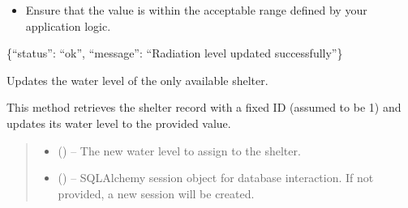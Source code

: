 \documentclass[letterpaper,10pt,english]{sphinxmanual}
\begin{document}
\begin{fulllineitems}
\begin{fulllineitems}
\begin{itemize}
\item {} 
\sphinxAtStartPar
Ensure that the  value is within the acceptable range defined by your application logic.

\end{itemize}
\begin{description}
\sphinxAtStartPar
\{“status”: “ok”, “message”: “Radiation level updated successfully”\}

\end{description}

\end{fulllineitems}


\begin{fulllineitems}
\label{\detokenize{app.controllers:app.controllers.shelter_controller.ShelterController.updateShelterWaterLevel}}
\pysigstartsignatures
\pysiglinewithargsret
{}
{\sphinxparamcomma {}}
{}
\pysigstopsignatures
\sphinxAtStartPar
Updates the water level of the only available shelter.

\sphinxAtStartPar
This method retrieves the shelter record with a fixed ID (assumed to be 1) and updates
its water level to the provided value.
\begin{quote}\begin{description}
\begin{itemize}
\item {} 
\sphinxAtStartPar
{} () – The new water level to assign to the shelter.

\item {} 
\sphinxAtStartPar
{} (\sphinxstyleliteralemphasis{\sphinxupquote{, }}) – SQLAlchemy session object for database interaction.
If not provided, a new session will be created.

\end{itemize}


\end{description}
\end{quote}
\end{fulllineitems}
\end{fulllineitems}
\end{document}
